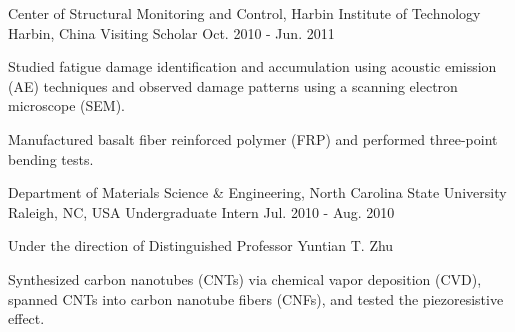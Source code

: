 \begin{cventries}
 \cventryprojtrued
    {Center of Structural Monitoring and Control, Harbin Institute of Technology} %
    {Harbin, China} %
    {Visiting Scholar} %
    {Oct. 2010 - Jun. 2011} %
    {     
     \begin{cvitems} %
       \item {Studied fatigue damage identification and accumulation using acoustic emission (AE) techniques and observed damage patterns using a scanning electron microscope (SEM).}
       \item {Manufactured basalt fiber reinforced polymer (FRP) and performed three-point bending tests.}
     \end{cvitems}
         }

 \cventryprojtrued
    {Department of Materials Science \& Engineering, North Carolina State University} %
    {Raleigh, NC, USA} %
    {Undergraduate Intern} %
    {Jul. 2010 - Aug. 2010} %
    {     
     \begin{cvitems} %
       \item {Under the direction of Distinguished Professor Yuntian T. Zhu}
       \item {Synthesized carbon nanotubes (CNTs) via chemical vapor deposition (CVD), spanned CNTs into carbon nanotube fibers (CNFs), and tested the piezoresistive effect.}
     \end{cvitems}
         }


\end{cventries}
